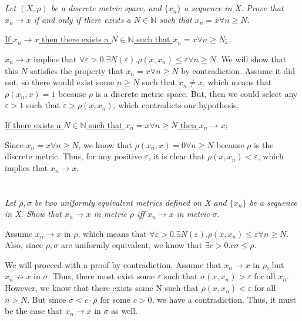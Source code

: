 \documentclass[]{article}
\newcommand{\naturals}{\mathbb{N}}
\begin{document}
	\section{}
		\textit{Let $(X, \rho)$ be a discrete metric space, and $\{x_n\}$ a sequence in X. Prove that $x_n \to x$ if and only if there exists a $N \in \naturals$ such that $x_n = x \forall n \geq N$.}

		\underline{If $x_n \to x$ then there exists a $N \in \naturals$ such that $x_n = x \forall n \geq N$:}

		$x_n \to x$ implies that $\forall \varepsilon > 0 . \exists N(\varepsilon) . \rho(x, x_n) \leq \varepsilon \forall n \geq N$. We will show that this $N$ satisfies the property that $x_n = x \forall n \geq N$ by contradiction. Assume it did not, so there would exist some $n \geq N$ such that $x_n \neq x$, which means that $\rho(x_n, x) = 1$ because $\rho$ is a discrete metric space. But, then we could select any $\varepsilon > 1$ such that $\varepsilon > \rho(x, x_n)$, which contradicts our hypothesis. 

		\underline{If there exists a $N \in \naturals$ such that $x_n = x \forall n \geq N$ then $x_n \to x$:}

		Since $x_n = x \forall n \geq N$, we know that $\rho(x_n, x) = 0 \forall n \geq N$ because $\rho$ is the discrete metric. Thus, for any positive $\varepsilon$, it is clear that $\rho(x, x_n) < \varepsilon$, which implies that $x_n \to x$. 

	\section{}
		\textit{Let $\rho, \sigma$ be two uniformly equivalent metrics defined on X and $\{x_n\}$ be a sequence in X. Show that $x_n \to x$ in metric $\rho$ iff $x_n \to x$ in metric $\sigma$.}

		

		Assume $x_n \to x$ in $\rho$, which means that $\forall \varepsilon > 0 . \exists N(\varepsilon) . \rho(x, x_n) \leq \varepsilon \forall n \geq N$. Also, since $\rho, \sigma$ are uniformly equivalent, we know that $\exists c > 0 . c \sigma \leq \rho$. 

		We will proceed with a proof by contradiction. Assume that $x_n \to x$ in $\rho$, but $x_n \not \to x$ in $\sigma$. Thus, there must exist some $\varepsilon$ such that $\sigma(x, x_n) > \varepsilon$ for all $x_n$. However, we know that there exists some N such that $\rho(x, x_n) < \varepsilon$ for all $n > N$. But since $\sigma < c \cdot \rho$ for some $c > 0$, we have a contradiction. Thus, it must be the case that $x_n \to x$ in $\sigma$ as well. 
\end{document}
